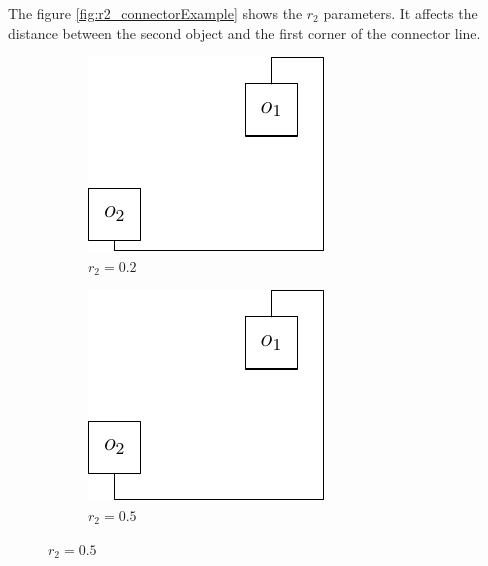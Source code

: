 \documentclass[a4paper,12pt]{report}
\begin{document}
The figure \ref{fig:r2_connectorExample} shows the $r_2$ parameters. It affects the distance between the second object and the first corner of the connector line.

\begin{figure}
  \centering
  \begin{subfigure}{.33\textwidth}
    \centering
    \includegraphics[width=0.9\linewidth]{connectorExample_r2_0_2.pdf}
    \caption{$r_2=0.2$}
  \end{subfigure}\hfill
  \begin{subfigure}{.33\textwidth}
    \centering
    \includegraphics[width=0.9\linewidth]{connectorExample_r2_0_5.pdf}
    \caption{$r_2=0.5$}

\end{subfigure}
\end{figure}
\end{document}
